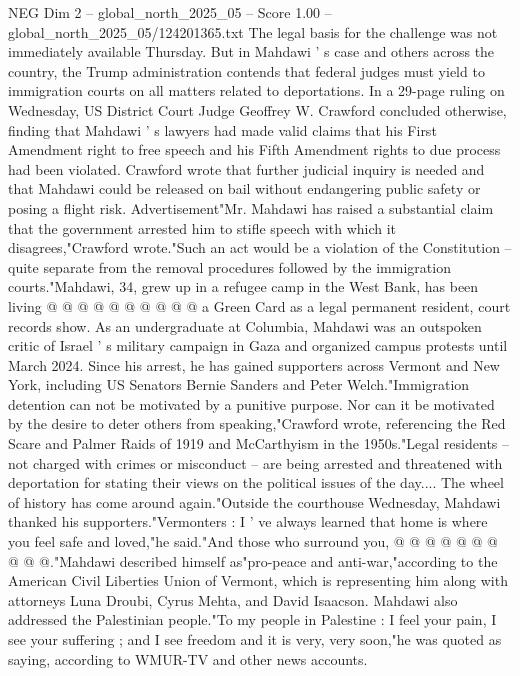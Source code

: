 \begin{textsample}{NEG Dim 2 – global\_north\_2025\_05 – Score 1.00 – global\_north\_2025\_05/124201365.txt}  \label{ex:f2_neg_040}
The legal basis for the challenge was not immediately available Thursday.
But in Mahdawi ' s case and others across the country, the Trump administration contends that federal judges must yield to immigration courts on all matters related to deportations.
In a 29-page ruling on Wednesday, US District Court Judge Geoffrey W.
Crawford concluded otherwise, finding that Mahdawi ' s lawyers had made valid claims that his First Amendment right to free speech and his Fifth Amendment rights to due process had been violated.
Crawford wrote that further judicial inquiry is needed and that Mahdawi could be released on bail without endangering public safety or posing a flight risk.
Advertisement"Mr.
Mahdawi has raised a substantial claim that the government arrested him to stifle speech with which it disagrees,"Crawford wrote."Such an act would be a violation of the Constitution -- quite separate from the removal procedures followed by the immigration courts."Mahdawi, 34, grew up in a refugee camp in the West Bank, has been living @ @ @ @ @ @ @ @ @ @ a Green Card as a legal permanent resident, court records show.
As an undergraduate at Columbia, Mahdawi was an outspoken critic of Israel ' s military campaign in Gaza and organized campus protests until March 2024.
Since his arrest, he has gained supporters across Vermont and New York, including US Senators Bernie Sanders and Peter Welch."Immigration detention can not be motivated by a punitive purpose.
Nor can it be motivated by the desire to deter others from speaking,"Crawford wrote, referencing the Red Scare and Palmer Raids of 1919 and McCarthyism in the 1950s."Legal residents -- not charged with crimes or misconduct -- are being arrested and threatened with deportation for stating their views on the political issues of the day....
The wheel of history has come around again."Outside the courthouse Wednesday, Mahdawi thanked his supporters."Vermonters : I ' ve always learned that home is where you feel safe and loved,"he said."And those who surround you, @ @ @ @ @ @ @ @ @ @."Mahdawi described himself as"pro-peace and anti-war,"according to the American Civil Liberties Union of Vermont, which is representing him along with attorneys Luna Droubi, Cyrus Mehta, and David Isaacson.
Mahdawi also addressed the Palestinian people."To my people in Palestine : I feel your pain, I see your suffering ; and I see freedom and it is very, very soon,"he was quoted as saying, according to WMUR-TV and other news accounts.

\end{textsample}
